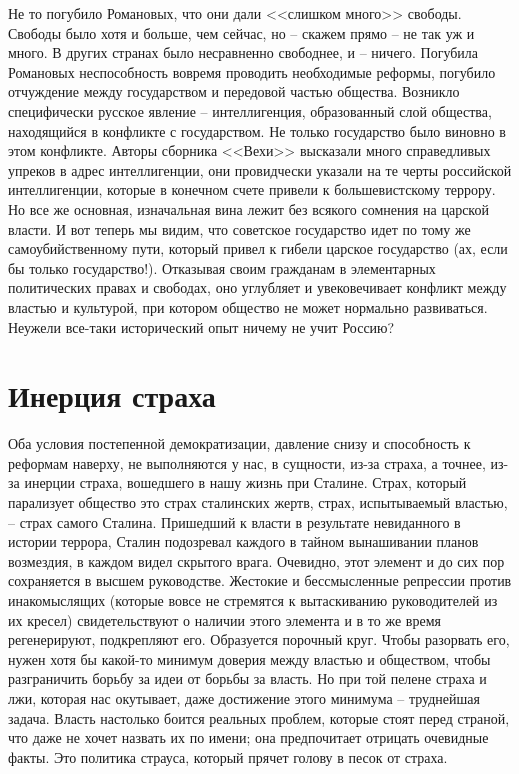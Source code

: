 \documentclass{book}
\begin{document}
Не то погубило Романовых, что они дали <<слишком много>> свободы. Свободы было хотя и больше, чем сейчас, но -- ска­жем прямо -- не так уж и много. В других странах было не­сравненно свободнее, и -- ничего. Погубила Романовых неспо­собность вовремя  проводить необходимые реформы, погуби­ло отчуждение между государством и передовой частью обще­ства. Возникло специфически русское явление -- интеллиген­ция, образованный слой общества, находящийся в конфликте с государством. Не только государство было виновно в этом конфликте. Авторы сборника <<Вехи>> высказали много спра­ведливых упреков в адрес интеллигенции, они провидчески указали на те черты российской интеллигенции, которые в ко­нечном счете привели к большевистскому террору. Но все же основная, изначальная вина лежит без всякого сомнения на царской власти. И вот теперь мы видим, что советское государство идет по тому же самоубийственному пути, который привел к гибели царское государство (ах, если бы только государство!). Отказывая своим гражданам в 
элементарных 
политических правах и свободах, оно углубляет и увековечивает конфликт между властью и культурой, при котором общество не может нормально развиваться. Неужели все-таки исторический опыт ничему не учит Россию?



\section{Инерция страха}

Оба условия постепенной демократизации, давление снизу и способность к реформам наверху, не выполняются у нас, в сущности, из-за страха, а точнее, из-за инерции страха,  вошедшего в нашу жизнь при Сталине. Страх, который парализует общество это страх сталинских жертв, страх, испытываемый властью, -- страх самого Сталина. Пришедший к власти в результате невиданного в истории террора, Сталин подозревал каждого в тайном вынашивании планов возмездия, в каждом видел скрытого врага. Очевидно, этот элемент и до сих пор сохраняется в высшем руководстве. Жестокие и бессмысленные репрессии против инакомыслящих (которые вовсе не стремятся к вытаскиванию руководителей из их кресел) свидетельствуют о наличии этого элемента и в то же время регенерируют, подкрепляют его. Образуется порочный круг. Чтобы разорвать его, нужен хотя бы какой-то минимум доверия между властью и обществом, чтобы разграничить борьбу за идеи от борьбы за власть. Но при той пелене страха и лжи, которая нас окутывает, даже достижение этого минимума -- 
труднейшая задача. Власть настолько боится реальных проблем, которые стоят перед страной, что даже не хочет назвать их по имени; она предпочитает отрицать очевидные факты. Это политика страуса, который прячет голову в песок от страха.
\end{document}

